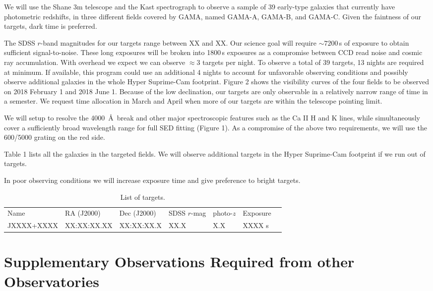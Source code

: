 \documentclass[letterpaper,12pt,dvips]{article}
\begin{document}
We will use the Shane 3m telescope and the Kast spectrograph to observe a sample of 39 early-type 
galaxies that currently have photometric redshifts, in three different fields covered by GAMA, 
named GAMA-A, GAMA-B, and GAMA-C. Given the faintness of our targets, dark time is preferred.  

The SDSS $r$-band magnitudes for our targets range between XX and XX. Our science goal will 
require $\sim7200$\,s of exposure to obtain sufficient signal-to-noise. These long exposures will 
be broken into 1800\,s exposures as a compromise between CCD read noise and cosmic ray 
accumulation. 
With overhead we expect we can observe $\approx3$ targets per night. To observe a total of 39 
targets, 13 nights are required at minimum. If available, this program could use an additional 4 
nights to account for unfavorable observing conditions and possibly observe additional galaxies in 
the whole Hyper Suprime-Cam footprint. Figure 2 shows the visibility curves of the four fields to 
be observed on 2018 February 1 and 2018 June 1. Because of the low declination, our targets are 
only observable in a relatively narrow range of time in a semester. We request time allocation in 
March and April when more of our targets are within the telescope pointing limit. 

We will setup to resolve the 4000~\AA\ break and other major spectroscopic features such as 
the Ca II H and K lines, while simultaneously cover a sufficiently broad wavelength range for full 
SED fitting (Figure 1). As a compromise of the above two requirements, we will use the 600/5000 
grating on the red side. 

Table 1 lists all the galaxies in the targeted fields. We will observe additional targets in the 
Hyper Suprime-Cam footprint if we run out of targets. 

In poor observing conditions we will increase exposure time and give preference to bright targets. 

\begin{table}
\caption{List of targets.}
\begin{tabular}{lllllll}
\hline
Name & RA (J2000) & Dec (J2000) & SDSS $r$-mag & photo-$z$ & Exposure \\
JXXXX+XXXX & XX:XX:XX.XX & XX:XX:XX.X & XX.X & X.X & XXXX s & \\
\hline
\end{tabular}
\end{table}

\section{Supplementary Observations Required from other Observatories}
\end{document}
